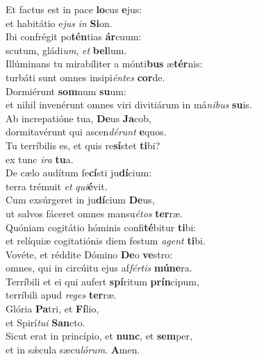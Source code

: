 \evenverse Et factus est in pace \textbf{lo}cus \textbf{e}jus:~\*\\
\evenverse et habitátio e\textit{jus} \textit{in} \textbf{Si}on.\\
\oddverse Ibi confrégit po\textbf{tén}tias \textbf{ár}cuum:~\*\\
\oddverse scutum, gládi\textit{um}, \textit{et} \textbf{bel}lum.\\
\evenverse Illúminans tu mirabíliter a mónti\textbf{bus} æ\textbf{tér}nis:~\*\\
\evenverse turbáti sunt omnes insipi\textit{én}\textit{tes} \textbf{cor}de.\\
\oddverse Dormiérunt \textbf{som}num \textbf{su}um:~\*\\
\oddverse et nihil invenérunt omnes viri divitiárum in má\textit{ni}\textit{bus} \textbf{su}is.\\
\evenverse Ab increpatióne tua, \textbf{De}us \textbf{Ja}cob,~\*\\
\evenverse dormitavérunt qui ascen\textit{dé}\textit{runt} \textbf{e}quos.\\
\oddverse Tu terríbilis es, et quis re\textbf{sí}stet \textbf{ti}bi?~\*\\
\oddverse ex tunc \textit{i}\textit{ra} \textbf{tu}a.\\
\evenverse De cælo audítum fe\textbf{cí}sti ju\textbf{dí}cium:~\*\\
\evenverse terra trémuit \textit{et} \textit{qui}\textbf{é}vit.\\
\oddverse Cum exsúrgeret in ju\textbf{dí}cium \textbf{De}us,~\*\\
\oddverse ut salvos fáceret omnes mansu\textit{é}\textit{tos} \textbf{ter}ræ.\\
\evenverse Quóniam cogitátio hóminis confi\textbf{té}bitur \textbf{ti}bi:~\*\\
\evenverse et relíquiæ cogitatiónis diem festum \textit{a}\textit{gent} \textbf{ti}bi.\\
\oddverse Vovéte, et réddite Dómino \textbf{De}o \textbf{ve}stro:~\*\\
\oddverse omnes, qui in circúitu ejus af\textit{fér}\textit{tis} \textbf{mú}\textbf{ne}ra.\\
\evenverse Terríbili et ei qui aufert \textbf{spí}ritum \textbf{prín}cipum,~\*\\
\evenverse terríbili apud \textit{re}\textit{ges} \textbf{ter}ræ.\\
\oddverse Glória \textbf{Pa}tri, et \textbf{Fí}lio,~\*\\
\oddverse et Spirí\textit{tu}\textit{i} \textbf{San}cto.\\
\evenverse Sicut erat in princípio, et \textbf{nunc}, et \textbf{sem}per,~\*\\
\evenverse et in sǽcula sæcu\textit{ló}\textit{rum}. \textbf{A}men.\\
